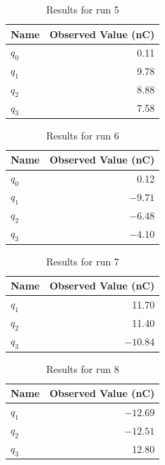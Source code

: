 %
\begin{table}[ht]
	\centering
	\begin{tabular}{|l|r|}
		\hline
		Name & Observed Value (nC) \\
		\hline
		$q_{0}$ & 0.11 \\
		$q_{1}$ & 9.78 \\
		$q_{2}$ & 8.88 \\
		$q_{3}$ & 7.58 \\
		\hline
	\end{tabular}
	\caption{Results for run 5}
	\label{table_01_run_5}
\end{table}
%
\begin{table}[ht]
	\centering
	\begin{tabular}{|l|r|}
		\hline
		Name & Observed Value (nC) \\
		\hline
		$q_{0}$ & 0.12 \\
		$q_{1}$ & $-9.71$ \\
		$q_{2}$ & $-6.48$ \\
		$q_{3}$ & $-4.10$ \\
		\hline
	\end{tabular}
	\caption{Results for run 6}
	\label{table_01_run_6}
\end{table}
%
\begin{table}[ht]
	\centering
	\begin{tabular}{|l|r|}
		\hline
		Name & Observed Value (nC) \\
		\hline
		$q_{1}$ & 11.70 \\
		$q_{2}$ & 11.40 \\
		$q_{3}$ & $-10.84$ \\
		\hline
	\end{tabular}
	\caption{Results for run 7}
	\label{table_01_run_7}
\end{table}
%
\begin{table}[ht]
	\centering
	\begin{tabular}{|l|r|}
		\hline
		Name & Observed Value (nC) \\
		\hline
		$q_{1}$ & $-12.69$ \\
		$q_{2}$ & $-12.51$ \\
		$q_{3}$ & 12.80 \\
		\hline
	\end{tabular}
	\caption{Results for run 8}
	\label{table_01_run_8}
\end{table}
%
\FloatBarrier
\newpage
